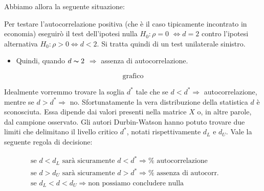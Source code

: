 \documentclass[a4paper]{report}
\newcounter{ese}
\theoremstyle{remark}
\begin{document}
\begin{enumerate}
\begin{enumerate}
Abbiamo allora la seguente situazione:

\end{enumerate}

Per testare l'autocorrelazione positiva (che \`{e} il caso tipicamente
incontrato in economia) eseguir\`{o} il test dell'ipotesi nulla $H_{0}:\rho
=0$ $\Leftrightarrow d=2$ contro l'ipotesi alternativa $H_{0}:\rho
>0\Leftrightarrow d<2$. Si tratta quindi di un test unilaterale sinistro.

\begin{itemize}
\item Quindi, quando $d\thicksim 2$ $\Rightarrow $ assenza di
autocorrelazione.
\end{itemize}

\begin{equation*}
\text{grafico}
\end{equation*}%
\vspace*{5cm}

Idealmente vorremmo trovare la soglia $d^{\ast }$ tale che se $d<d^{\ast
}\Rightarrow $ autocorrelazione, mentre se $d>d^{\ast }\Rightarrow $ no.
Sfortunatamente la vera distribuzione della statistica $d$ \`{e}
sconosciuta. Essa dipende dai valori presenti nella matrice $X$ o, in altre
parole, dal campione osservato. Gli autori Durbin-Watson hanno potuto
trovare due limiti che delimitano il livello critico $d^{\ast }$, notati
rispettivamente $d_{L}$ e $d_{U}$. Vale la seguente regola di decisione:

$\ \ \ \ \ \ \ \ \ \ \ \ \ \ \ 
\begin{array}{l}
\text{se }d<d_{L}\text{ sar\`{a} sicuramente }d<d^{\ast }\Rightarrow \text{%
autocorrelazione} \\ 
\text{se }d>d_{U}\text{ sar\`{a} sicuramente }d>d^{\ast }\Rightarrow \text{%
assenza di autocorr.} \\ 
\text{se }d_{L}<d<d_{U}\Rightarrow \text{non possiamo concludere nulla}%
\end{array}%
$


\end{enumerate}
\end{document}
